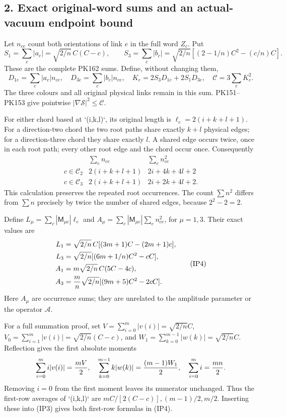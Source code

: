 \documentclass[11pt]{article}
\begin{document}
\subsection*{2. Exact original-word sums and an actual-vacuum endpoint bound}

Let \(n_{ce}\) count both orientations of link \(e\) in the full
word \(Z_c\). Put
\[
 S_1=\sum_c|a_c|=\sqrt{2/n}\,C(C-c),\qquad
 S_3=\sum_c|b_c|=\sqrt{2/n}[(2-1/n)C^2-(c/n)C].
\]
These are the complete PK162 sums. Define, without changing them,
\[
 D_{1e}=\sum_c|a_c|n_{ce},\quad D_{3e}=\sum_c|b_c|n_{ce},\quad
 K_e=2S_3D_{1e}+2S_1D_{3e},\quad
 \mathcal C=3\sum_eK_e^2.\tag{IP2}
\]
The three colours and all original physical links remain in this sum.
PK151–PK153 give pointwise \(|\nabla\mathcal S|^2\le\mathcal C\).

For either chord based at `(i,k,l)`, its original length is
\(\ell_c=2(i+k+l+1)\). For a direction-two chord the two root paths
share exactly \(k+l\) physical edges; for a direction-three chord they
share exactly \(l\). A shared edge occurs twice, once in each root
path; every other root edge and the chord occur once. Consequently
\[
\begin{array}{c|cc}
 &\sum_en_{ce}&\sum_en_{ce}^2\\ \hline
c\in\mathcal C_2&2(i+k+l+1)&2i+4k+4l+2\\
c\in\mathcal C_3&2(i+k+l+1)&2i+2k+4l+2.
\end{array}\tag{IP3}
\]
This calculation preserves the repeated root occurrences. The count
\(\sum n^2\) differs from \(\sum n\) precisely by twice the number
of shared edges, because \(2^2-2=2\).

Define \(L_\mu=\sum_c|\mathsf M_{\mu c}|\ell_c\) and
\(A_\mu=\sum_c|\mathsf M_{\mu c}|\sum_en_{ce}^2\), for \(\mu=1,3\).
Their exact values are
\[
\begin{aligned}
 L_1&=\sqrt{2/n}\,C[(3m+1)C-(2m+1)c],\\
 L_3&=\sqrt{2/n}[(6m+1/n)C^2-cC],\\
 A_1&=m\sqrt{2/n}\,C(5C-4c),\\
 A_3&={m\over n}\sqrt{2/n}[(9m+5)C^2-2cC].
\end{aligned}\tag{IP4}
\]
Here \(A_\mu\) are occurrence sums; they are unrelated to the
amplitude parameter or the operator \(\mathcal A\).

For a full summation proof, set
\(V=\sum_{i=0}^m|v(i)|=\sqrt{2/n}C\),
\(V_0=\sum_{i=1}^m|v(i)|=\sqrt{2/n}(C-c)\), and
\(W_1=\sum_{k=0}^{m-1}|w(k)|=\sqrt{2/n}C\).
Reflection gives the first absolute moments
\[
\sum_{i=0}^m i|v(i)|={mV\over2},\quad
\sum_{k=0}^{m-1}k|w(k)|={(m-1)W_1\over2},\quad
\sum_{i=0}^m i={mn\over2}.
\]
Removing \(i=0\) from the first moment leaves its numerator unchanged.
Thus the first-row averages of `(i,k,l)` are
\(mC/[2(C-c)],(m-1)/2,m/2\). Inserting these into (IP3)
gives both first-row formulas in (IP4).
\end{document}
